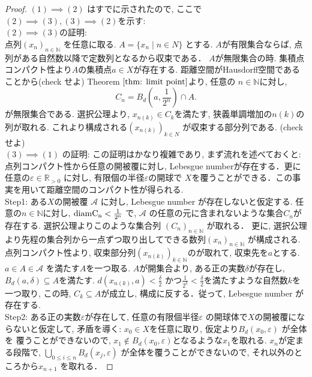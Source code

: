 \documentclass[lualatex]{ltjsbook}
\theoremstyle{remark}
\theoremstyle{plain}
\begin{document}
\begin{proof}
	$(1) \implies (2)$ はすでに示されたので,  ここで$(2) \implies (3) ,  (3) \implies (2)$を示す:\\
	$(2) \implies (3)$の証明:\\
	点列$(x_n)_{n \in \mathbb{N}}$ を任意に取る. $A = \{x_n  \mid n \in N\} $ とする.
	 $A$が有限集合ならば,   点列がある自然数以降で定数列となるから収束である．
	  $A$が無限集合の時.  集積点コンパクト性より$A$の集積点$a \in X$が存在する.
	  距離空間がHausdorff空間であることから(check せよ)
	  Theorem $\ref{thm: limit point}$より,   任意の $n \in \mathbb{N}$に対し, 
	  \[
	 C_n =  B_d(a,  \frac{1}{2^{n}}) \cap A
	  .\] 
	  が無限集合である. 選択公理より,   $x_{n(k)} \in C_k$を満たす,  狭義単調増加の$n(k)$の列が取れる.
	  これより構成される$(x_{n(k)})_{k \in N}$ が収束する部分列である. (check せよ)\\
	  $(3) \implies (1) $ の証明: この証明はかなり複雑であり,  まず流れを述べておくと:
	  点列コンパクト性から任意の開被覆に対し,  Lebesgue numberが存在する．更に任意の$\varepsilon \in \mathbb{R}_{>0}$ に対し,  有限個の半径$\varepsilon$の開球で $X$を覆うことができる．この事実を用いて距離空間のコンパクト性が得られる.\\
	Step1: ある$X$の開被覆 $\mathcal{A}$ に対し,  
	Lebesgue number が存在しないと仮定する. 
	任意の$n \in \mathbb{N}$に対し,  
	$\rm{diam}C_n<\frac{1}{2^{n}}$ で, 
	$\mathcal{A}$ の任意の元に含まれないような集合$C_n$が存在する.  
	選択公理よりこのような集合列 $(C_n)_{n \in \mathbb{N}}$ が取れる．
	更に,  選択公理より先程の集合列から一点ずつ取り出してできる数列$(x_n)_{n \in \mathbb{N}}$ が構成される.
	点列コンパクト性より,  
	収束部分列$\left( x_{n(k)} \right) _{k \in \mathbb{N}}$のが取れて,  
	収束先を$a$とする.  
	$a \in A \in \mathcal{A} $ を満たす$A$を一つ取る.  
	$A$が開集合より,  ある正の実数$\delta$が存在し,   $B_d (a,  \delta) \subseteq A$を満たす. 
	$d(x_{n(k)}, a)< \frac{\delta}{2}$ かつ$\frac{1}{2^{k} } < \frac{\delta}{2}$を満たすような自然数$k$を一つ取り,  
	この時,   $C_k \subseteq A$が成立し,  構成に反する．従って,  Lebesgue number が存在する.\\
	Step2: ある正の実数$\varepsilon$が存在して,  任意の有限個半径$\varepsilon$ の開球体で$X$の開被覆にならないと仮定して,  矛盾を導く: 
	$x_0 \in X$を任意に取り,  仮定より$B_d\left( x_0 ,  \varepsilon \right) $ が全体を
	覆うことができないので,  $x_1 \not\in  B_d(x_0 , \varepsilon)$となるような$x_1$を取れる.
	 $x_n$が定まる段階で,   $\bigcup_{0 \le i \le n} B_d(x_j, \varepsilon)$ が全体を覆うことができないので,  それ以外のところから$x_{n+1}$ を取れる．

\end{proof}
\end{document}
